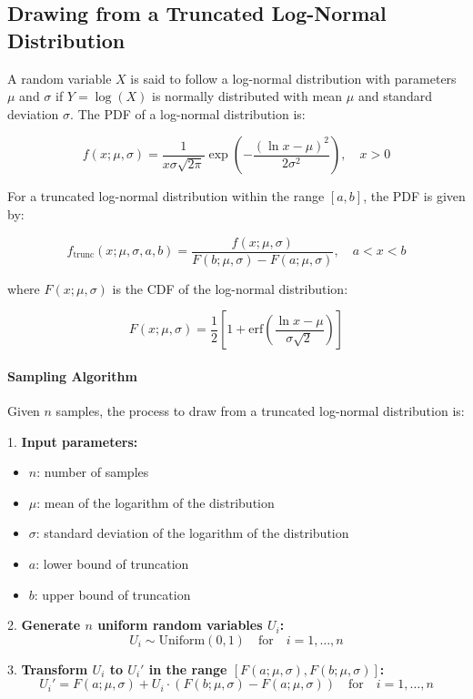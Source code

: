 \documentclass[12pt]{article}
\theoremstyle{plain}
\theoremstyle{definition}
\begin{document}
\subsection{Drawing from a Truncated Log-Normal Distribution}

A random variable \( X \) is said to follow a log-normal distribution with parameters \(\mu\) and \(\sigma\) if \( Y = \log(X) \) is normally distributed with mean \(\mu\) and standard deviation \(\sigma\). The PDF of a log-normal distribution is:

\[
f(x; \mu, \sigma) = \frac{1}{x \sigma \sqrt{2 \pi}} \exp\left( -\frac{(\ln x - \mu)^2}{2\sigma^2} \right), \quad x > 0
\]

For a truncated log-normal distribution within the range \([a, b]\), the PDF is given by:

\[
f_{\text{trunc}}(x; \mu, \sigma, a, b) = \frac{f(x; \mu, \sigma)}{F(b; \mu, \sigma) - F(a; \mu, \sigma)}, \quad a < x < b
\]

where \(F(x; \mu, \sigma)\) is the CDF of the log-normal distribution:

\[
F(x; \mu, \sigma) = \frac{1}{2} \left[1 + \text{erf}\left(\frac{\ln x - \mu}{\sigma \sqrt{2}}\right)\right]
\]

\paragraph{Sampling Algorithm}

Given \( n \) samples, the process to draw from a truncated log-normal distribution is:

1. \textbf{Input parameters:}
   \begin{itemize}
       \item \( n \): number of samples
       \item \( \mu \): mean of the logarithm of the distribution
       \item \( \sigma \): standard deviation of the logarithm of the distribution
       \item \( a \): lower bound of truncation
       \item \( b \): upper bound of truncation
   \end{itemize}

2. \textbf{Generate \( n \) uniform random variables \( U_i \):}
   \[
   U_i \sim \text{Uniform}(0, 1) \quad \text{for} \quad i = 1, \ldots, n
   \]

3. \textbf{Transform \( U_i \) to \( U_i' \) in the range \([F(a; \mu, \sigma), F(b; \mu, \sigma)]\):}
   \[
   U_i' = F(a; \mu, \sigma) + U_i \cdot (F(b; \mu, \sigma) - F(a; \mu, \sigma)) \quad \text{for} \quad i = 1, \ldots, n
   \]
\end{document}
